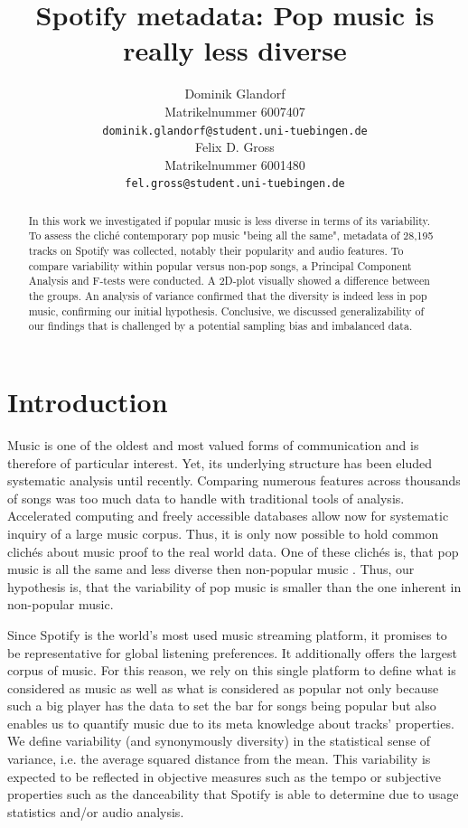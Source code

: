 \documentclass{article}
\title{Spotify metadata: Pop music is really less diverse}
\author{%
  Dominik Glandorf\\
  Matrikelnummer 6007407\\
  \texttt{dominik.glandorf@student.uni-tuebingen.de} \\
  \And
  Felix D. Gross\\
  Matrikelnummer 6001480\\
  \texttt{fel.gross@student.uni-tuebingen.de} \\
}
\begin{document}
\maketitle

\begin{abstract}
In this work we investigated if popular music is less diverse in terms of its variability.
To assess the cliché contemporary pop music "being all the same",
metadata of 28,195 tracks on Spotify was collected, notably their popularity and audio features. To compare variability within popular versus non-pop songs, a Principal Component Analysis and F-tests were conducted.
A 2D-plot visually showed a difference between the groups. An analysis of variance confirmed that the diversity is indeed less in pop music, confirming our initial hypothesis.
Conclusive, we discussed generalizability of our findings that is challenged by a potential sampling bias and imbalanced data.
\end{abstract}

\section{Introduction}
Music is one of the oldest and most valued forms of communication and is therefore of particular interest. Yet, its underlying structure has been eluded systematic analysis until recently.
Comparing numerous features across thousands of songs was too much data to handle with traditional tools of analysis. Accelerated computing and freely accessible databases allow now for systematic inquiry of a large music corpus. Thus, it is only now possible to hold common clichés about music proof to the real world data.
One of these clichés is, that pop music is all the same and less diverse then non-popular music \citep[see for example][]{serra2012measuring}. Thus, our hypothesis is, that the variability of pop music is smaller than the one inherent in non-popular music.

Since Spotify is the world's most used music streaming platform, it promises to be representative for global listening preferences. It additionally offers the largest corpus of music. For this reason, we rely on this single platform to define what is considered as music as well as what is considered as popular not only because such a big player has the data to set the bar for songs being popular but also enables us to quantify music due to its meta knowledge about tracks' properties.
We define variability (and synonymously diversity) in the statistical sense of variance, i.e. the average squared distance from the mean. This variability is expected to be reflected in objective measures such as the tempo or subjective properties such as the danceability that Spotify is able to determine due to usage statistics and/or audio analysis.
\end{document}
